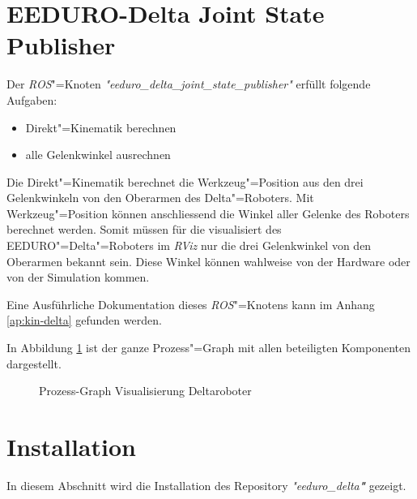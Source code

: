 \section{EEDURO-Delta Joint State Publisher}
Der \textit{ROS}"=Knoten \textit{\textit{"}eeduro\_delta\_joint\_state\_publisher\textit{"}} erfüllt folgende Aufgaben:
\begin{itemize}
\item Direkt"=Kinematik berechnen
\item alle Gelenkwinkel ausrechnen
\end{itemize}
Die Direkt"=Kinematik berechnet die Werkzeug"=Position aus den drei Gelenkwinkeln von den Oberarmen des Delta"=Roboters.
Mit Werkzeug"=Position können anschliessend die Winkel aller Gelenke des Roboters berechnet werden.
Somit müssen für die visualisiert des EEDURO"=Delta"=Roboters im \textit{RViz} nur die drei Gelenkwinkel von den Oberarmen bekannt sein.
Diese Winkel können wahlweise von der Hardware oder von der Simulation kommen.

Eine Ausführliche Dokumentation dieses \textit{ROS}"=Knotens kann im Anhang \ref{ap:kin-delta} gefunden werden.

In Abbildung \ref{Ab:prozess} ist der ganze Prozess"=Graph mit allen beteiligten Komponenten dargestellt.

\begin{figure}[ht!]
	\centering
{}
	\caption{Prozess-Graph Visualisierung Deltaroboter}
	\label{Ab:prozess}
\end{figure}

\section{Installation}
In diesem Abschnitt wird die Installation des Repository \textit{\textit{"}eeduro\_delta\textbf{"}} gezeigt.

